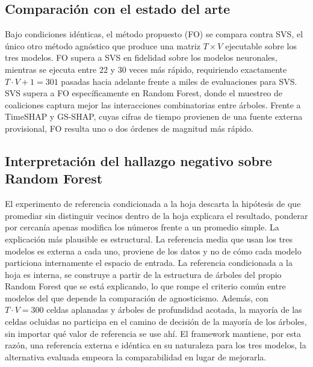 \subsection{Comparación con el estado del arte}

Bajo condiciones idénticas, el método propuesto (FO) se compara contra SVS, el único otro método agnóstico que produce una matriz $T \times V$ ejecutable sobre los tres modelos. FO supera a SVS en fidelidad sobre los modelos neuronales, mientras se ejecuta entre $22$ y $30$ veces más rápido, requiriendo exactamente $T{\cdot}V{+}1=301$ pasadas hacia adelante frente a miles de evaluaciones para SVS. SVS supera a FO específicamente en Random Forest, donde el muestreo de coaliciones captura mejor las interacciones combinatorias entre árboles. Frente a TimeSHAP y GS-SHAP, cuyas cifras de tiempo provienen de una fuente externa provisional, FO resulta uno o dos órdenes de magnitud más rápido.

\subsection{Interpretación del hallazgo negativo sobre Random Forest}

El experimento de referencia condicionada a la hoja descarta la hipótesis de que promediar sin distinguir vecinos dentro de la hoja explicara el resultado, ponderar por cercanía apenas modifica los números frente a un promedio simple. La explicación más plausible es estructural. La referencia media que usan los tres modelos es externa a cada uno, proviene de los datos y no de cómo cada modelo particiona internamente el espacio de entrada. La referencia condicionada a la hoja es interna, se construye a partir de la estructura de árboles del propio Random Forest que se está explicando, lo que rompe el criterio común entre modelos del que depende la comparación de agnosticismo. Además, con $T \cdot V = 300$ celdas aplanadas y árboles de profundidad acotada, la mayoría de las celdas ocluidas no participa en el camino de decisión de la mayoría de los árboles, sin importar qué valor de referencia se use ahí. El framework mantiene, por esta razón, una referencia externa e idéntica en su naturaleza para los tres modelos, la alternativa evaluada empeora la comparabilidad en lugar de mejorarla.
